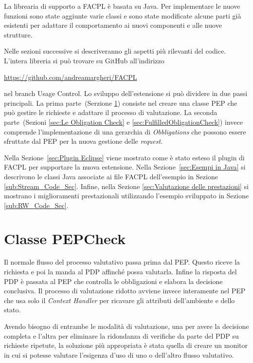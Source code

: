 \label{chap:Estensione della libreria FACPL}
La librearia di supporto a \ac{FACPL} è basata su Java. Per implementare le nuove funzioni sono state aggiunte varie classi e sono state modificate
alcune parti già esistenti per adattare il comportamento ai nuovi componenti e alle nuove strutture.\par
Nelle sezioni successive si descriveranno gli aspetti più rilevanti del codice. L'intera libreria si può trovare su
GitHub all'indirizzo
\begin{center}
  \url{https://github.com/andreamargheri/FACPL}
\end{center}
nel branch Usage Control.
Lo sviluppo dell'estensione si può dividere in due passi principali.
La prima parte~(Serzione \ref{sec:PEPCheck}) consiste nel creare una classe \ac{PEP} che può gestire le richieste e adattare il processo di valutazione.
La seconda parte~(Sezioni \ref{sec:Le Obligation Check} e \ref{sec:FulfilledObligationCheck})
invece comprende l'implementazione di una gerarchia di \emph{Obbligations} che possono essere
sfruttate dal \ac{PEP} per la nuova gestione delle \emph{request}. \par
Nella Sezione~\ref{sec:Plugin Eclipse} viene mostrato come è stato esteso il plugin di FACPL
per supportare la nuova estensione.
Nella Sezione~\ref{sec:Esempi in Java} si descrivono le classi Java associate ai file \ac{FACPL}
dell'esempio in Sezione \ref{sub:Stream_Code_Sec}.
Infine, nella Sezione \ref{sec:Valutazione delle prestazioni} si mostrano i miglioramenti
prestazionali utilizzando l'esempio sviluppato in Sezione \ref{sub:RW_Code_Sec}.
\section{Classe PEPCheck}
\label{sec:PEPCheck}
Il normale flusso del processo valutativo passa prima dal \ac{PEP}. Questo riceve la richiesta e poi la manda al
\ac{PDP} affinché possa valutarla. Infine la risposta del \ac{PDP} è passata al \ac{PEP} che controlla le obbligazioni e
elabora la decisione conclusiva.
Il processo di valutazione ridotto avviene invece interamente nel \ac{PEP} che usa solo il \emph{Context Handler}
per ricavare gli attributi dell'ambiente e dello stato.

Avendo bisogno di entrambe le modalità di valutazione, una per avere la decisione completa e l'altra per eliminare la
ridondanza di verifiche da parte del \ac{PDP} su richieste ripetute,
la soluzione più appropriata è stata quella di creare un monitor
in cui si potesse valutare l'esigenza d'uso di uno o dell'altro flusso valutativo.

